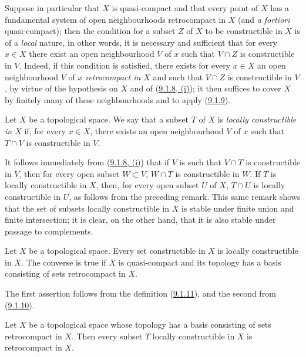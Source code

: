\begin{env}[9.1.10]
\label{0.9.1.10}
Suppose in particular that $X$ is quasi-compact and that every point
of $X$ has a fundamental system of open neighbourhoods retrocompact
in $X$ (and \emph{a fortiori} quasi-compact); then the condition for a
subset $Z$ of $X$ to be constructible in $X$ is of a \emph{local} nature,
in other words, it is necessary and sufficient that for every $x\in X$
there exist an open neighbourhood $V$ of $x$ such that $V\cap Z$ is
constructible in $V$. Indeed, if this condition is satisfied, there
exists for every $x\in X$ an open neighbourhood $V$ of $x$ \emph{retrocompact
in $X$} and such that $V\cap Z$ is constructible in $V$, by virtue of the
hypothesis on $X$ and of (\hyperref[0.9.1.8]{9.1.8, (i)}); it then
suffices to cover $X$ by finitely many of these neighbourhoods and to apply
(\hyperref[0.9.1.9]{9.1.9}).
\end{env}

\begin{definition}[9.1.11]
\label{0.9.1.11}
Let $X$ be a topological space. We say that a subset $T$ of $X$ is
\emph{locally constructible in $X$} if, for every $x\in X$, there exists
an open neighbourhood $V$ of $x$ such that $T\cap V$ is constructible in $V$.
\end{definition}

It follows immediately from (\hyperref[0.9.1.8]{9.1.8, (i)}) that if $V$
is such that $V\cap T$ is constructible in $V$, then for every open subset
$W\subset V$, $W\cap T$ is constructible in $W$. If $T$ is locally
constructible in $X$, then, for every open subset $U$ of $X$, $T\cap U$ is
locally constructible in $U$, as follows from the preceding
remark. This same remark shows that the set of subsets locally
constructible in $X$ is stable under finite union and finite intersection;
it is clear, on the other hand, that it is also stable under passage to
complements.

\begin{proposition}[9.1.12]
\label{0.9.1.12}
Let $X$ be a topological space. Every set constructible in $X$ is
locally constructible in $X$. The converse is true if $X$ is
quasi-compact and its topology has a basis consisting of sets
retrocompact in $X$.
\end{proposition}

The first assertion follows from the definition
(\hyperref[0.9.1.11]{9.1.11}), and the second from
(\hyperref[0.9.1.10]{9.1.10}).

\begin{corollary}[9.1.13]
\label{0.9.1.13}
Let $X$ be a topological space whose topology has a basis consisting
of sets retrocompact in $X$. Then every subset $T$ locally
constructible in $X$ is retrocompact in $X$.
\end{corollary}

